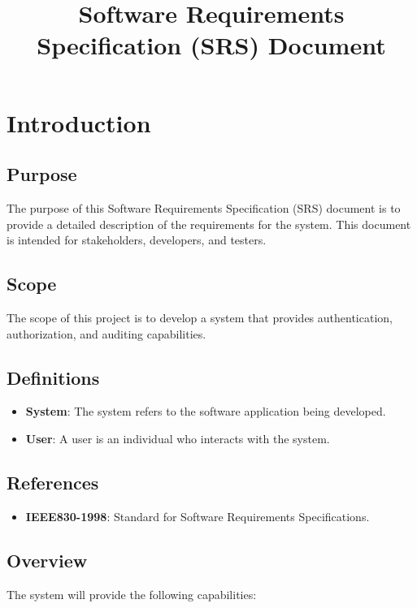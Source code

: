 \documentclass{article}
\begin{document}
\title{Software Requirements Specification (SRS) Document}
\author{}
\date{}

\maketitle

\tableofcontents

\section{Introduction}
\label{sec:introduction}

\subsection{Purpose}
The purpose of this Software Requirements Specification (SRS) document is to provide a detailed description of the requirements for the system. This document is intended for stakeholders, developers, and testers.

\subsection{Scope}
The scope of this project is to develop a system that provides authentication, authorization, and auditing capabilities.

\subsection{Definitions}
\begin{itemize}
 \item \textbf{System}: The system refers to the software application being developed.
 \item \textbf{User}: A user is an individual who interacts with the system.
\end{itemize}

\subsection{References}
\begin{itemize}
 \item \textbf{IEEE830-1998}: Standard for Software Requirements Specifications.
\end{itemize}

\subsection{Overview}
The system will provide the following capabilities:
\end{document}
